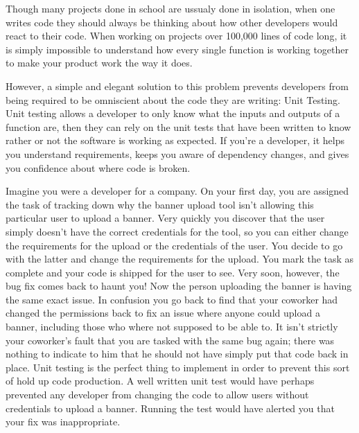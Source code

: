

Though many projects done in school are ussualy done in isolation, when one writes code they should always be thinking about how other developers would react to their code.
When working on projects over 100,000 lines of code long, it is simply impossible to understand how every single function is working together to make your product work the way it does.

However, a simple and elegant solution to this problem prevents developers from being required to be omniscient about the code they are writing: Unit Testing.
Unit testing allows a developer to only know what the inputs and outputs of a function are, then they can rely on the unit tests that have been written to know rather or not the software is working as expected.
If you're a developer, it helps you understand requirements, keeps you aware of dependency changes, and gives you confidence about where code is broken.

Imagine you were a developer for a company. On your first day, you are assigned the task of tracking down why the banner upload tool isn't allowing this particular user to upload a banner.
Very quickly you discover that the user simply doesn't have the correct credentials for the tool, so you can either change the requirements for the upload or the credentials of the user.
You decide to go with the latter and change the requirements for the upload. You mark the task as complete and your code is shipped for the user to see.
Very soon, however, the bug fix comes back to haunt you! Now the person uploading the banner is having the same exact issue.
In confusion you go back to find that your coworker had changed the permissions back to fix an issue where anyone could upload a banner, including those who where not supposed to be able to.
It isn't strictly your coworker's fault that you are tasked with the same bug again; there was nothing to indicate to him that he should not have simply put that code back in place.
Unit testing is the perfect thing to implement in order to prevent this sort of hold up code production.
A well written unit test would have perhaps prevented any developer from changing the code to allow users without credentials to upload a banner. Running the test would have alerted you that your fix was inappropriate.

